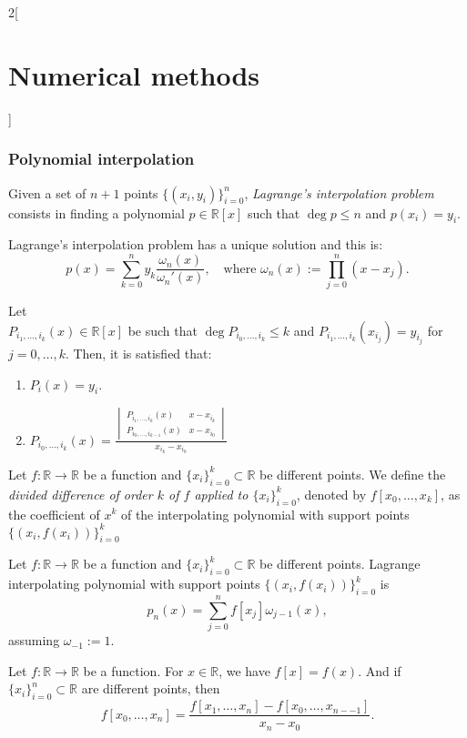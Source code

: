 \documentclass[class=article,10pt,crop=false]{standalone}
\begin{document}
\begin{multicols}{2}[\section{Numerical methods}]
\subsubsection*{Polynomial interpolation}
\begin{definition}
Given a set of $n+1$ points $\{(x_i,y_i)\}_{i=0}^n$, \textit{Lagrange's interpolation problem} consists in finding a polynomial $p\in\mathbb{R}[x]$ such that $\deg p\leq n$ and $p(x_i)=y_i$.
\end{definition}
\begin{prop}
Lagrange's interpolation problem has a unique solution and this is: $$p(x)=\sum_{k=0}^ny_k\frac{\omega_n(x)}{\omega_n'(x)},\quad\text{where }\omega_n(x):=\prod_{j=0}^n(x-x_j).$$
\end{prop}
\begin{prop}
Let \\$P_{i_1,\ldots,i_k}(x)\in\mathbb{R}[x]$ be such that $\deg P_{i_0,\ldots,i_k}\leq k$ and $P_{i_1,\ldots,i_k}(x_{i_j})=y_{i_j}$ for $j=0,\ldots,k$. Then, it is satisfied that:
\begin{enumerate}
    \item $P_i(x)=y_i$.
    \item $P_{i_0,\ldots,i_k}(x)=\frac{\begin{vmatrix}
    P_{i_1,\ldots,i_k}(x) & x-x_{i_k}\\
    P_{i_0,\ldots,i_{k-1}}(x) & x-x_{i_0}
    \end{vmatrix}}{x_{i_k}-x_{i_0}}$
\end{enumerate}
\end{prop}
\begin{definition}
Let $f:\mathbb{R}\rightarrow\mathbb{R}$ be a function and $\{x_i\}_{i=0}^k\subset\mathbb{R}$ be different points. We define the \textit{divided difference of order $k$ of $f$ applied to $\{x_i\}_{i=0}^k$}, denoted by $f[x_0,\ldots,x_k]$, as the coefficient of $x^k$ of the interpolating polynomial with support points $\{(x_i,f(x_i))\}_{i=0}^k$ 
\end{definition}
\begin{prop}
Let $f:\mathbb{R}\rightarrow\mathbb{R}$ be a function and $\{x_i\}_{i=0}^k\subset\mathbb{R}$ be different points. Lagrange interpolating polynomial with support points $\{(x_i,f(x_i))\}_{i=0}^k$ is $$p_n(x)=\sum_{j=0}^nf[x_j]\omega_{j-1}(x),$$ assuming $\omega_{-1}:=1$.
\end{prop}
\begin{prop}
Let $f:\mathbb{R}\rightarrow\mathbb{R}$ be a function. For $x\in\mathbb{R}$, we have $f[x]=f(x)$. And if $\{x_i\}_{i=0}^n\subset\mathbb{R}$ are different points, then $$f[x_0,\ldots,x_n]=\frac{f[x_1,\ldots,x_n]-f[x_0,\ldots,x_{n--1}]}{x_n-x_0}.$$ 

\end{prop}
\end{multicols}
\end{document}
